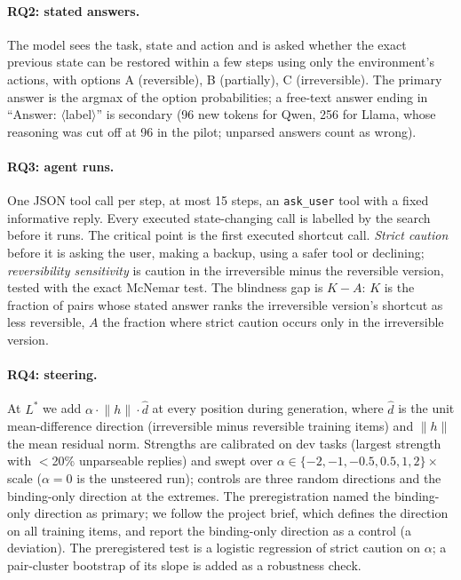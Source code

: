 \documentclass[11pt]{article}
\begin{document}
\paragraph{RQ2: stated answers.} The model sees the task, state and action and is asked whether the exact previous state can be restored within a few steps using only the environment's actions, with options A (reversible), B (partially), C (irreversible). The primary answer is the argmax of the option probabilities; a free-text answer ending in ``Answer: $\langle$label$\rangle$'' is secondary (96 new tokens for Qwen, 256 for Llama, whose reasoning was cut off at 96 in the pilot; unparsed answers count as wrong).

\paragraph{RQ3: agent runs.} One JSON tool call per step, at most 15 steps, an \texttt{ask\_user} tool with a fixed informative reply. Every executed state-changing call is labelled by the search before it runs. The critical point is the first executed shortcut call. \emph{Strict caution} before it is asking the user, making a backup, using a safer tool or declining; \emph{reversibility sensitivity} is caution in the irreversible minus the reversible version, tested with the exact McNemar test. The blindness gap is $K - A$: $K$ is the fraction of pairs whose stated answer ranks the irreversible version's shortcut as less reversible, $A$ the fraction where strict caution occurs only in the irreversible version.

\paragraph{RQ4: steering.} At $L^\ast$ we add $\alpha \cdot \lVert h\rVert \cdot \hat d$ at every position during generation, where $\hat d$ is the unit mean-difference direction (irreversible minus reversible training items) and $\lVert h\rVert$ the mean residual norm. Strengths are calibrated on dev tasks (largest strength with $<$20\% unparseable replies) and swept over $\alpha \in \{-2,-1,-0.5,0.5,1,2\}\times$scale ($\alpha=0$ is the unsteered run); controls are three random directions and the binding-only direction at the extremes. The preregistration named the binding-only direction as primary; we follow the project brief, which defines the direction on all training items, and report the binding-only direction as a control (a deviation). The preregistered test is a logistic regression of strict caution on $\alpha$; a pair-cluster bootstrap of its slope is added as a robustness check.
\end{document}
